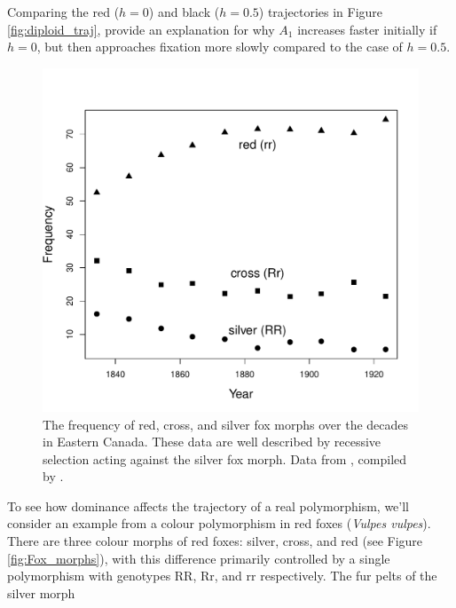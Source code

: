 \begin{question}
Comparing the red ($h=0$) and black ($h=0.5$) trajectories in Figure \ref{fig:diploid_traj}, provide an explanation for why $A_1$ increases faster initially if $h=0$, but then approaches fixation more slowly compared to the case of $h=0.5$.
\end{question}



\begin{figure}
\begin{center}
  \includegraphics[width = 0.8 \textwidth]{Journal_figs/single_locus_selection/silver_fox/fox_morph_freqs.pdf}
\end{center}
\caption{The frequency of red, cross, and silver fox morphs over the
  decades in Eastern Canada. These data are well described by
  recessive selection acting against the silver fox morph. Data from
  \citet{elton:42}, compiled by \citet{Allendorf:09}. } \label{fig:Fox_morph_freqs}
\end{figure}
To see how dominance affects the trajectory of a real
polymorphism, we'll consider an example from a colour polymorphism in
red foxes ({\it Vulpes vulpes}). There are three colour morphs of red foxes: silver, cross, and
red (see Figure \ref{fig:Fox_morphs}), with this difference primarily
controlled by a single polymorphism with genotypes RR, Rr, and rr respectively. The fur pelts of the silver morph
